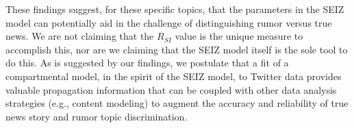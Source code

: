 These findings suggest, for these specific topics, that the parameters in the SEIZ model can potentially aid in the challenge of distinguishing rumor versus true news. We are not claiming that the $R_{SI}$ value is the unique measure to accomplish this, nor are we claiming that the SEIZ model itself is the sole tool to do this. As is suggested by our findings, we postulate that a fit of a compartmental model, in the spirit of the SEIZ model, to Twitter data provides valuable propagation information that can be coupled with other data analysis strategies  (e.g., content modeling)
to augment the accuracy and reliability of true news story and rumor topic discrimination.

